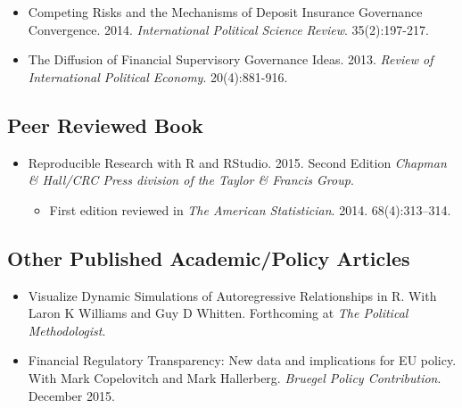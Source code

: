 \documentclass[a4paper]{article}
\begin{document}
{\begin{itemize}
        \begin{itemize}
            \item Application of the theoretical framework to Austria published on the \href{https://www.weforum.org/agenda/2015/03/a-bank-bailout-lesson-from-austria/}{World Economic Forum}.
        \end{itemize}

    \item Competing Risks and the Mechanisms of Deposit Insurance Governance Convergence. 2014. {\emph{International Political Science Review}}. 35(2):197-217.

    \item The Diffusion of Financial Supervisory Governance Ideas. 2013. {\emph{Review of International Political Economy}}. 20(4):881-916.

\end{itemize}

\subsection*{Peer Reviewed Book}

\begin{itemize}
    \item Reproducible Research with R and RStudio. 2015. Second Edition {\emph{Chapman \& Hall/CRC Press division of the Taylor \& Francis Group}}.

        \begin{itemize}
            \item First edition reviewed in \emph{The American Statistician}. 2014. 68(4):313--314.
        \end{itemize}

\end{itemize}

\subsection*{Other Published Academic/Policy Articles}

\begin{itemize}

    \item Visualize Dynamic Simulations of Autoregressive Relationships in R. With Laron K Williams and Guy D Whitten. Forthcoming at \emph{The Political Methodologist}.

    \item Financial Regulatory Transparency: New data and implications for EU policy. With Mark Copelovitch and Mark Hallerberg. \emph{Bruegel Policy Contribution}. December 2015.


\end{itemize}}
\end{document}
